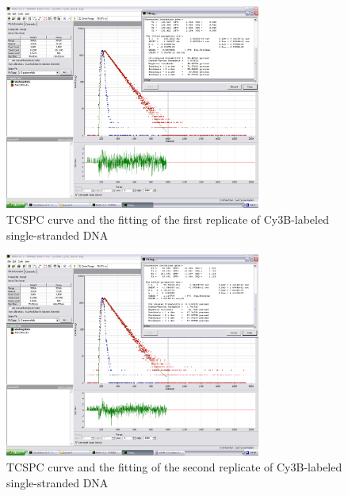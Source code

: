 \documentclass[a4paper,english,12pt,bibliography=totoc]{scrreprt}
\begin{document}
\begin{figure}
    \centering
    \includegraphics[width=0.75\textwidth]{images/ssDNA/ssDNA_Cy3B_data1_fit1.png}
    \caption{TCSPC curve and the fitting of the first replicate of Cy3B-labeled single-stranded DNA}
    \label{Cy3B_data1_fit1}
\end{figure}

\begin{figure}
    \centering
    \includegraphics[width=0.75\textwidth]{images/ssDNA/ssDNA_Cy3B_data2_fit1.png}
    \caption{TCSPC curve and the fitting of the second replicate of Cy3B-labeled single-stranded DNA}
    \label{Cy3B_data2_fit1}
\end{figure}
\end{document}
